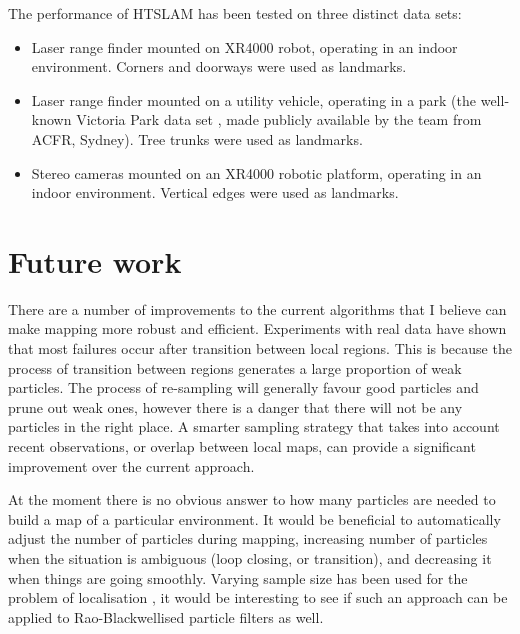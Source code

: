 The performance of HTSLAM has been tested on three distinct data sets:

\begin{itemize}
\item Laser range finder mounted on XR4000 robot, operating in an indoor
environment. Corners and doorways were used as landmarks.

\item Laser range finder mounted on a utility vehicle, operating in a
  park (the well-known Victoria Park data set \cite{VP_dataset}, made
  publicly available by the team from ACFR, Sydney). Tree trunks were
  used as landmarks.

\item Stereo cameras mounted on an XR4000 robotic platform, operating
  in an indoor environment. Vertical edges were used as landmarks.

\end{itemize}



\section{Future work}

There are a number of improvements to the current algorithms that I
believe can make mapping more robust and efficient. Experiments with
real data have shown that most failures occur after transition between
local regions. This is because the process of transition between
regions generates a large proportion of weak particles. The process of
re-sampling will generally favour good particles and prune out weak
ones, however there is a danger that there will not be any particles
in the right place. A smarter sampling strategy that takes into
account recent observations, or overlap between local maps, can
provide a significant improvement over the current approach.

At the moment there is no obvious answer to how many particles are
needed to build a map of a particular environment. It would be
beneficial to automatically adjust the number of particles during
mapping, increasing number of particles when the situation is
ambiguous (loop closing, or transition), and decreasing it when things
are going smoothly. Varying sample size has been used for the problem
of localisation \cite{KLDSampling}, it would be interesting to see if
such an approach can be applied to Rao-Blackwellised particle filters
as well.

